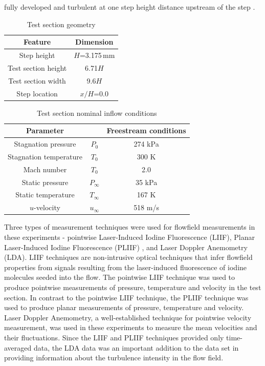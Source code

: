 fully developed and turbulent at one step height distance upstream of 
the step \cite{McDaniel1991}. 
%
\begin{table}[h]
  \caption{Test section geometry}
  \label{backward-facing-step-test-section-dims}
  \begin{center}
    \begin{tabular}{cc}
      \hline\hline
      Feature & Dimension \\
      \hline
      Step height         & $H$=3.175\,mm \\
      Test section height & 6.71$H$  \\
      Test section width  & 9.6$H$   \\
      Step location       & $x/H$=0.0 \\
      \hline \hline
    \end{tabular}
  \end{center}
\end{table}
%
\begin{table}[h]
  \caption{Test section nominal inflow conditions}
  \label{backward-facing-step-inflow-conditions}
  \begin{center}
    \begin{tabular}{ccc}
      \hline\hline
      Parameter & & Freestream conditions \\
      \hline
      Stagnation pressure    & $P_0$      & 274 kPa \\     
      Stagnation temperature & $T_0$      & 300 K   \\   
      Mach number            & $T_0$      & 2.0     \\
      Static pressure        & $P_\infty$ & 35 kPa  \\  
      Static temperature     & $T_\infty$ & 167 K   \\
      $u$-velocity           & $u_\infty$ & 518 m/s \\
      \hline \hline
    \end{tabular}
  \end{center}
\end{table}
Three types of measurement techniques were used for flowfield measurements
in these experiments - pointwise Laser-Induced Iodine Fluorescence (LIIF),
Planar Laser-Induced Iodine Fluorescence (PLIIF) \cite{McDaniel1991, Hartfield1993} 
, and Laser Doppler Anemometry (LDA). LIIF 
techniques are non-intrusive optical techniques that infer flowfield
properties from signals resulting from the laser-induced fluorescence of
iodine molecules seeded into the flow. The pointwise LIIF technique was 
used to produce pointwise measurements of pressure, temperature and velocity
in the test section. In contrast to the pointwise LIIF technique, the PLIIF 
technique was used to produce planar measurements of pressure, temperature and 
velocity. Laser Doppler Anemometry, a well-established technique for pointwise
velocity measurement, was used in these experiments to measure the mean velocities 
and their fluctuations. Since the LIIF and PLIIF techniques provided only 
time-averaged data, the LDA data was an important addition to the data set in 
providing information about the turbulence intensity in the flow field.

